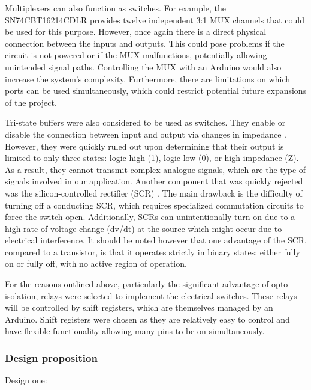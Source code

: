 Multiplexers can also function as switches. For example, the SN74CBT16214CDLR \cite{sn74cbt_datasheet} provides twelve independent 3:1 MUX channels that could be used for this purpose. However, once again there is a direct physical connection between the inputs and outputs. This could pose problems if the circuit is not powered or if the MUX malfunctions, potentially allowing unintended signal paths. Controlling the MUX with an Arduino would also increase the system’s complexity. Furthermore, there are limitations on which ports can be used simultaneously, which could restrict potential future expansions of the project.

Tri-state buffers were also considered to be used as switches. They enable or disable the connection between input and output via changes in impedance \cite{digital_buffer}. However, they were quickly ruled out upon determining that their output is limited to only three states: logic high (1), logic low (0), or high impedance (Z). As a result, they cannot transmit complex analogue signals, which are the type of signals involved in our application. Another component that was quickly rejected was the silicon-controlled rectifier (SCR) \cite{scr_switch}. The main drawback is the difficulty of turning off a conducting SCR, which requires specialized commutation circuits to force the switch open. Additionally, SCRs can unintentionally turn on due to a high rate of voltage change (dv/dt) at the source which might occur due to electrical interference. It should be noted however that one advantage of the SCR, compared to a transistor, is that it operates strictly in binary states: either fully on or fully off, with no active region of operation.

For the reasons outlined above, particularly the significant advantage of opto-isolation, relays were selected to implement the electrical switches. These relays will be controlled by shift registers, which are themselves managed by an Arduino. Shift registers were chosen as they are relatively easy to control and have flexible functionality allowing many pins to be on simultaneously.

\subsubsection{Design proposition}
Design one:

